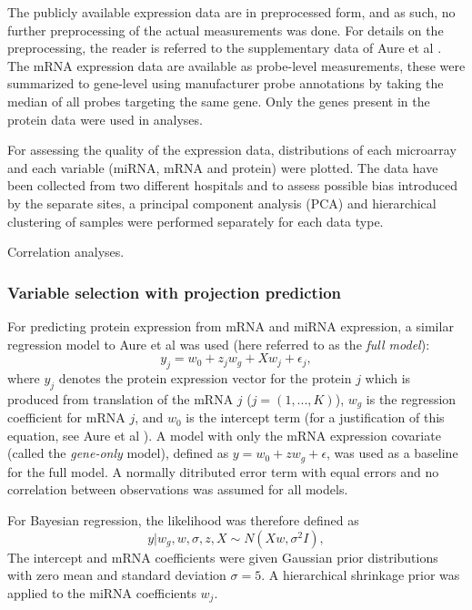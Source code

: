 The publicly available expression data are in preprocessed form, and as such,
no further preprocessing of the actual measurements was done. For details on
the preprocessing, the reader is referred to the supplementary data of Aure et
al \citep{Aure2015}. The mRNA expression data are available as probe-level
measurements, these were summarized to gene-level using manufacturer probe
annotations by taking the median of all probes targeting the same gene.
Only the genes present in the protein data were used in analyses.

For assessing the quality of the expression data, distributions of each
microarray and each variable (miRNA, mRNA and protein) were plotted. The data
have been collected from two different hospitals and to assess possible bias
introduced by the separate sites, a principal component analysis (PCA) and
hierarchical clustering of samples were performed separately for each data
type.



Correlation analyses.


\subsubsection{Variable selection with projection prediction}\label{sec:PPVS}

For predicting protein expression from mRNA and miRNA expression, a similar
regression model to Aure et al was used (here referred to as the \emph{full
model}):
\begin{equation}
	y_j = w_0 + z_j w_g + X w_j + \epsilon_j,
\end{equation}
where $y_j$ denotes the protein expression vector for the protein $j$ which
is produced from translation of the mRNA $j$ ($j = (1, ..., K)$), $w_g$
is the regression coefficient for mRNA $j$, and $w_0$ is the intercept term
(for a justification of this equation, see Aure et al \citep{Aure2015}).
A model with only the mRNA expression covariate (called the \emph{gene-only} model),
defined as $y = w_0 + z w_g + \epsilon$, was used as a baseline for the full model.
A normally ditributed error term with equal errors and no correlation
between observations was assumed for all models.

For Bayesian regression, the likelihood was therefore defined as
\begin{equation}
	y | w_g, w, \sigma, z, X \sim N(Xw, \sigma^2I),
\end{equation}
The intercept and mRNA coefficients were given Gaussian prior
distributions with zero mean and standard deviation $\sigma=5$.
A hierarchical shrinkage prior was applied to the miRNA coefficients
$w_j$.

